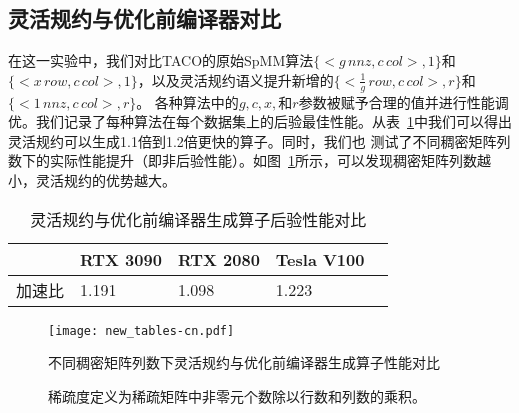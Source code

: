 \subsection{灵活规约与优化前编译器对比}
在这一实验中，我们对比TACO的原始SpMM算法$\{<g\,nnz, c\,col>,1\}$和$\{<x\,row,c\,col >,1\}$，以及灵活规约语义提升新增的$\{<\frac{1}{g}\,row, c\,col>,r\}$和$\{<1\,nnz , c\,col>,r\}$。
各种算法中的$g,c,x,$和$r$参数被赋予合理的值并进行性能调优。我们记录了每种算法在每个数据集上的后验最佳性能。从表~\ref{tab:comp-all}中我们可以得出灵活规约可以生成1.1倍到1.2倍更快的算子。同时，我们也
测试了不同稠密矩阵列数下的实际性能提升（即非后验性能）。如图~\ref{fig:comp-tables}所示，可以发现稠密矩阵列数越小，灵活规约的优势越大。
\begin{table}
  \centering
  \caption{灵活规约与优化前编译器生成算子后验性能对比}
  \begin{tabular}{lllll}
  \toprule
  & RTX 3090  & RTX 2080 & Tesla V100 \\
  \midrule
  加速比   & 1.191   & 1.098  & 1.223\\
  \bottomrule
  \end{tabular}
  \label{tab:comp-all}
\end{table}
\begin{figure}[h]%
  \centering
  \texttt{[image: new\_tables-cn.pdf]}
  \caption{不同稠密矩阵列数下灵活规约与优化前编译器生成算子性能对比}
  \caption*{稀疏度定义为稀疏矩阵中非零元个数除以行数和列数的乘积。}
  \label{fig:comp-tables}
\end{figure}
